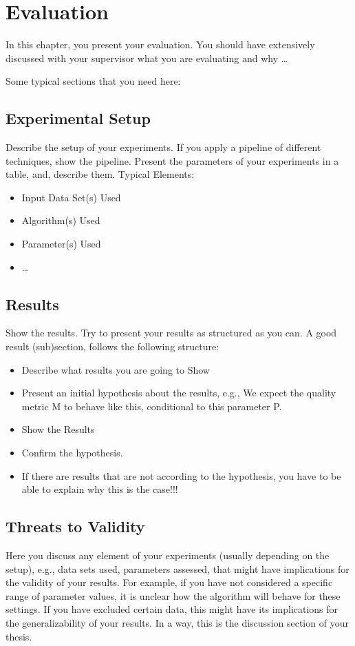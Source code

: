 \chapter{Evaluation}
\label{chap:eval}

In this chapter, you present your evaluation.
You should have extensively discussed with your supervisor what you are evaluating and why \dots

Some typical sections that you need here:
\section{Experimental Setup}
Describe the setup of your experiments.
If you apply a pipeline of different techniques, show the pipeline.
Present the parameters of your experiments in a table, and, describe them.
Typical Elements:
\begin{itemize}
    \item Input Data Set(s) Used
    \item Algorithm(s) Used
    \item Parameter(s) Used
    \item \dots
\end{itemize}

\section{Results}
Show the results.
Try to present your results as structured as you can.
A good result (sub)section, follows the following structure:
\begin{itemize}
    \item Describe what results you are going to Show
    \item Present an initial hypothesis about the results, e.g., We expect the quality metric M to behave like this, conditional to this parameter P.
    \item Show the Results
    \item Confirm the hypothesis.
    \item If there are results that are not according to the hypothesis, you have to be able to explain why this is the case!!!
\end{itemize}

\section{Threats to Validity}
Here you discuss any element of your experiments (usually depending on the setup), e.g., data sets used, parameters assessed, that might have implications for the validity of your results.
For example, if you have not considered a specific range of parameter values, it is unclear how the algorithm will behave for these settings.
If you have excluded certain data, this might have its implications for the generalizability of your results.
In a way, this is the discussion section of your thesis.
